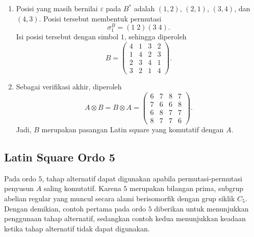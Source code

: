 \begin{contoh}
\begin{enumerate}
    \item Posisi yang masih bernilai $\varepsilon$ pada $B^*$ adalah
          $(1,2)$, $(2,1)$, $(3,4)$, dan $(4,3)$. Posisi tersebut membentuk
          permutasi
          \[
            \sigma_1^B=(1\;2)(3\;4).
          \]
          Isi posisi tersebut dengan simbol $1$, sehingga diperoleh
          \[
            B=
            \begin{pmatrix}
              4 & 1 & 3 & 2 \\
              1 & 4 & 2 & 3 \\
              2 & 3 & 4 & 1 \\
              3 & 2 & 1 & 4
            \end{pmatrix}.
          \]

    \item Sebagai verifikasi akhir, diperoleh
          \[
            A\otimes B
            =
            B\otimes A
            =
            \begin{pmatrix}
              6 & 7 & 8 & 7 \\
              7 & 6 & 6 & 8 \\
              6 & 8 & 7 & 7 \\
              8 & 7 & 7 & 6
            \end{pmatrix}.
          \]
          Jadi, $B$ merupakan pasangan Latin square yang komutatif dengan $A$.
  \end{enumerate}
\end{contoh}

\subsection{Latin Square Ordo 5}

Pada ordo $5$, tahap alternatif dapat digunakan apabila permutasi-permutasi
penyusun $A$ saling komutatif. Karena $5$ merupakan bilangan prima, subgrup
abelian regular yang muncul secara alami berisomorfik dengan grup siklik
$C_5$. Dengan demikian, contoh pertama pada ordo $5$ diberikan untuk
menunjukkan penggunaan tahap alternatif, sedangkan contoh kedua menunjukkan
keadaan ketika tahap alternatif tidak dapat digunakan.

